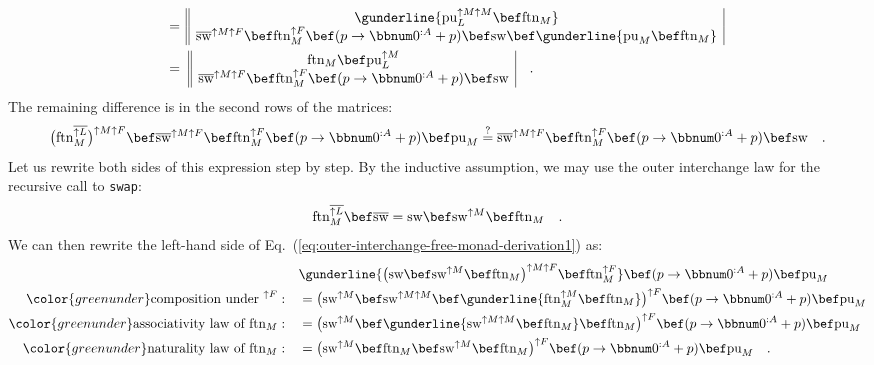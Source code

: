 \begin{align*}
 & \quad=\,\begin{array}{||c|}
\gunderline{\text{pu}_{L}^{\uparrow M\uparrow M}\bef\text{ftn}_{M}}\\
\overline{\text{sw}}^{\uparrow M\uparrow F}\bef\text{ftn}_{M}^{\uparrow F}\bef(p\rightarrow\bbnum 0^{:A}+p)\bef\text{sw}\bef\gunderline{\text{pu}_{M}\bef\text{ftn}_{M}}
\end{array}\\
 & \quad=\,\,\begin{array}{||c|}
\text{ftn}_{M}\bef\text{pu}_{L}^{\uparrow M}\\
\overline{\text{sw}}^{\uparrow M\uparrow F}\bef\text{ftn}_{M}^{\uparrow F}\bef(p\rightarrow\bbnum 0^{:A}+p)\bef\text{sw}
\end{array}\quad.
\end{align*}
The remaining difference is in the second rows of the matrices:
\begin{equation}
\big(\text{ftn}_{M}^{\overline{\uparrow L}}\big)^{\uparrow M\uparrow F}\bef\overline{\text{sw}}^{\uparrow M\uparrow F}\bef\text{ftn}_{M}^{\uparrow F}\bef(p\rightarrow\bbnum 0^{:A}+p)\bef\text{pu}_{M}\overset{?}{=}\overline{\text{sw}}^{\uparrow M\uparrow F}\bef\text{ftn}_{M}^{\uparrow F}\bef(p\rightarrow\bbnum 0^{:A}+p)\bef\text{sw}\quad.\label{eq:outer-interchange-free-monad-derivation1}
\end{equation}
Let us rewrite both sides of this expression step by step. By the
inductive assumption, we may use the outer interchange law for the
recursive call to \lstinline!swap!:
\[
\text{ftn}_{M}^{\overline{\uparrow L}}\bef\overline{\text{sw}}=\text{sw}\bef\text{sw}^{\uparrow M}\bef\text{ftn}_{M}\quad.
\]
We can then rewrite the left-hand side of Eq.~(\ref{eq:outer-interchange-free-monad-derivation1})
as:
\begin{align*}
 & \gunderline{\big(\text{sw}\bef\text{sw}^{\uparrow M}\bef\text{ftn}_{M}\big)^{\uparrow M\uparrow F}\bef\text{ftn}_{M}^{\uparrow F}}\bef(p\rightarrow\bbnum 0^{:A}+p)\bef\text{pu}_{M}\\
{\color{greenunder}\text{composition under }^{\uparrow F}:}\quad & =\big(\text{sw}^{\uparrow M}\bef\text{sw}^{\uparrow M\uparrow M}\bef\gunderline{\text{ftn}_{M}^{\uparrow M}\bef\text{ftn}_{M}}\big)^{\uparrow F}\bef(p\rightarrow\bbnum 0^{:A}+p)\bef\text{pu}_{M}\\
{\color{greenunder}\text{associativity law of }\text{ftn}_{M}:}\quad & =\big(\text{sw}^{\uparrow M}\bef\gunderline{\text{sw}^{\uparrow M\uparrow M}\bef\text{ftn}_{M}}\bef\text{ftn}_{M}\big)^{\uparrow F}\bef(p\rightarrow\bbnum 0^{:A}+p)\bef\text{pu}_{M}\\
{\color{greenunder}\text{naturality law of }\text{ftn}_{M}:}\quad & =\big(\text{sw}^{\uparrow M}\bef\text{ftn}_{M}\bef\text{sw}^{\uparrow M}\bef\text{ftn}_{M}\big)^{\uparrow F}\bef(p\rightarrow\bbnum 0^{:A}+p)\bef\text{pu}_{M}\quad.
\end{align*}
